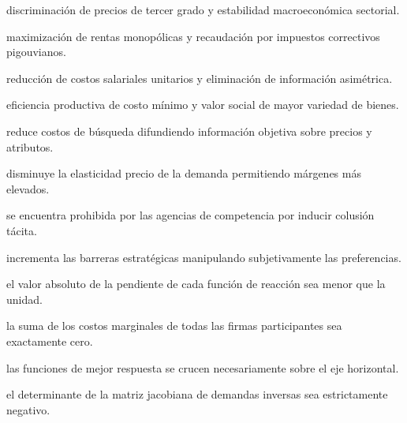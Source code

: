 \begin{opts}
    \item discriminación de precios de tercer grado y estabilidad macroeconómica sectorial.
    \item maximización de rentas monopólicas y recaudación por impuestos correctivos pigouvianos.
    \item reducción de costos salariales unitarios y eliminación de información asimétrica.
    \item eficiencia productiva de costo mínimo y valor social de mayor variedad de bienes.
\end{opts}

\begin{opts}
    \item reduce costos de búsqueda difundiendo información objetiva sobre precios y atributos.
    \item disminuye la elasticidad precio de la demanda permitiendo márgenes más elevados.
    \item se encuentra prohibida por las agencias de competencia por inducir colusión tácita.
    \item incrementa las barreras estratégicas manipulando subjetivamente las preferencias.
\end{opts}

\begin{opts}
    \item el valor absoluto de la pendiente de cada función de reacción sea menor que la unidad.
    \item la suma de los costos marginales de todas las firmas participantes sea exactamente cero.
    \item las funciones de mejor respuesta se crucen necesariamente sobre el eje horizontal.
    \item el determinante de la matriz jacobiana de demandas inversas sea estrictamente negativo.
\end{opts}

